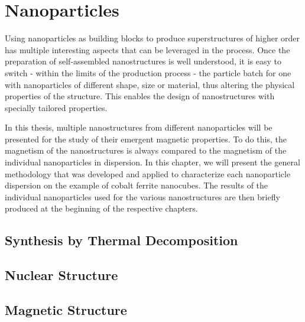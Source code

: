 \documentclass[\main/dresen_thesis.tex]{subfiles}
\begin{document}
\chapter{Nanoparticles}\label{ch:nanoparticles}
Using nanoparticles as building blocks to produce superstructures of higher order has multiple interesting aspects that can be leveraged in the process. 
Once the preparation of self-assembled nanostructures is well understood, it is easy to switch - within the limits of the production process - the particle batch for one with nanoparticles of different shape, size or material, thus altering the physical properties of the structure.
This enables the design of nanostructures with specially tailored properties. 

In this thesis, multiple nanostructures from different nanoparticles will be presented for the study of their emergent magnetic properties. 
To do this, the magnetism of the nanostructures is always compared to the magnetism of the individual nanoparticles in dispersion. 
In this chapter, we will present the general methodology that was developed and applied to characterize each nanoparticle dispersion on the example of cobalt ferrite nanocubes.
The results of the individual nanoparticles used for the various nanostructures are then briefly produced at the beginning of the respective chapters.

\section{Synthesis by Thermal Decomposition}

\section{Nuclear Structure}

\section{Magnetic Structure}
\end{document}
